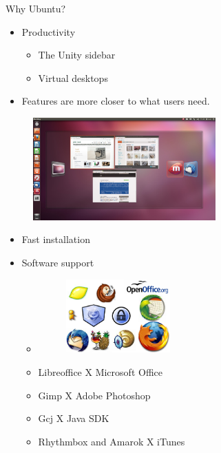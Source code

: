 \documentclass{beamer}
\begin{document}
 \begin{frame}{Why Ubuntu?}
  \begin{itemize}
   \pause
   \item Productivity
    \begin{itemize}
     \item The Unity sidebar
     \item Virtual desktops
     \pause
    \end{itemize}
   \item Features are more closer to what users need.
  \end{itemize}
  \begin{figure}
   \includegraphics[width=7cm]{Images/altgrav}
  \end{figure}  
 \end{frame}

 \begin{frame}
  \begin{itemize}
   \item Fast installation
   \pause
   \item Software support
   \begin{itemize}
    \item
     \begin{figure}
      \includegraphics[width=4cm]{Images/Open-Source-Applications-For-Cloud}
     \end{figure}
    \item Libreoffice X Microsoft Office
    \item Gimp X Adobe Photoshop
    \item Gcj X Java SDK
    \item Rhythmbox and Amarok X iTunes
   \end{itemize}
  \end{itemize}
 \end{frame}
\end{document}

